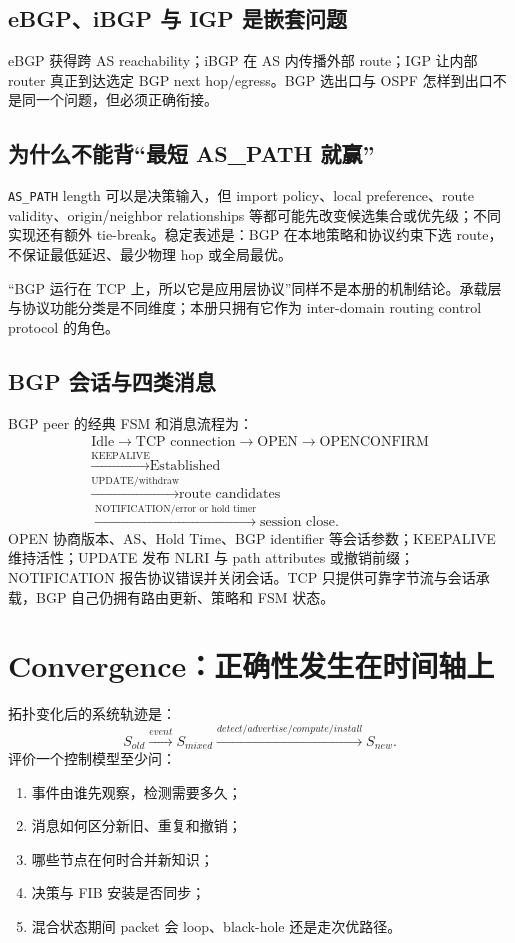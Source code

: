 \documentclass[11pt,a4paper]{ctexart}
\newcommand{\code}[1]{\texttt{#1}}
\begin{document}
\subsection{eBGP、iBGP 与 IGP 是嵌套问题}

eBGP 获得跨 AS reachability；iBGP 在 AS 内传播外部 route；IGP 让内部 router 真正到达选定 BGP next hop/egress。BGP 选出口与 OSPF 怎样到出口不是同一个问题，但必须正确衔接。

\subsection{为什么不能背“最短 AS\_PATH 就赢”}

\code{AS\_PATH} length 可以是决策输入，但 import policy、local preference、route validity、origin/neighbor relationships 等都可能先改变候选集合或优先级；不同实现还有额外 tie-break。稳定表述是：BGP 在本地策略和协议约束下选 route，不保证最低延迟、最少物理 hop 或全局最优。

“BGP 运行在 TCP 上，所以它是应用层协议”同样不是本册的机制结论。承载层与协议功能分类是不同维度；本册只拥有它作为 inter-domain routing control protocol 的角色。

\subsection{BGP 会话与四类消息}

BGP peer 的经典 FSM 和消息流程为：
\[
\begin{gathered}
\text{Idle}\to\text{TCP connection}\to\text{OPEN}\to\text{OPENCONFIRM}\\
\xrightarrow{\text{KEEPALIVE}}\text{Established}\\
\xrightarrow{\text{UPDATE/withdraw}}\text{route candidates}\\
\xrightarrow{\text{NOTIFICATION/error or hold timer}}\text{session close}.
\end{gathered}
\]
OPEN 协商版本、AS、Hold Time、BGP identifier 等会话参数；KEEPALIVE 维持活性；UPDATE 发布 NLRI 与 path attributes 或撤销前缀；NOTIFICATION 报告协议错误并关闭会话。TCP 只提供可靠字节流与会话承载，BGP 自己仍拥有路由更新、策略和 FSM 状态。

\section{Convergence：正确性发生在时间轴上}

拓扑变化后的系统轨迹是：
\[
S_{old}\xrightarrow{event}S_{mixed}
\xrightarrow{detect/advertise/compute/install}S_{new}.
\]
评价一个控制模型至少问：
\begin{enumerate}
  \item 事件由谁先观察，检测需要多久；
  \item 消息如何区分新旧、重复和撤销；
  \item 哪些节点在何时合并新知识；
  \item 决策与 FIB 安装是否同步；
  \item 混合状态期间 packet 会 loop、black-hole 还是走次优路径。
\end{enumerate}
\end{document}
